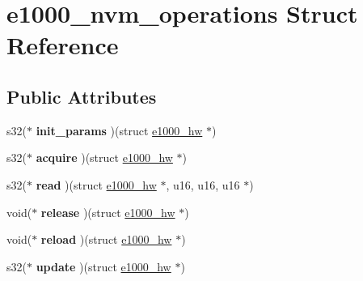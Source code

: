 \hypertarget{structe1000__nvm__operations}{
\section{e1000\_\-nvm\_\-operations Struct Reference}
\label{structe1000__nvm__operations}
}
\subsection*{Public Attributes}
\begin{DoxyCompactItemize}
\item 
\hypertarget{structe1000__nvm__operations_afb7771dd134bee981aeee957ad20549b}{
s32($\ast$ {\bfseries init\_\-params} )(struct \hyperlink{structe1000__hw}{e1000\_\-hw} $\ast$)}
\label{structe1000__nvm__operations_afb7771dd134bee981aeee957ad20549b}

\item 
\hypertarget{structe1000__nvm__operations_a521ce4663135adb16bf8e0385822c911}{
s32($\ast$ {\bfseries acquire} )(struct \hyperlink{structe1000__hw}{e1000\_\-hw} $\ast$)}
\label{structe1000__nvm__operations_a521ce4663135adb16bf8e0385822c911}

\item 
\hypertarget{structe1000__nvm__operations_a65dfa7519f2e87f7d5a583dd325e36cc}{
s32($\ast$ {\bfseries read} )(struct \hyperlink{structe1000__hw}{e1000\_\-hw} $\ast$, u16, u16, u16 $\ast$)}
\label{structe1000__nvm__operations_a65dfa7519f2e87f7d5a583dd325e36cc}

\item 
\hypertarget{structe1000__nvm__operations_a020af00d4e48abad2f72a8ea4ab6b35d}{
void($\ast$ {\bfseries release} )(struct \hyperlink{structe1000__hw}{e1000\_\-hw} $\ast$)}
\label{structe1000__nvm__operations_a020af00d4e48abad2f72a8ea4ab6b35d}

\item 
\hypertarget{structe1000__nvm__operations_a1fbf74027acf101831cf3f93b4adf597}{
void($\ast$ {\bfseries reload} )(struct \hyperlink{structe1000__hw}{e1000\_\-hw} $\ast$)}
\label{structe1000__nvm__operations_a1fbf74027acf101831cf3f93b4adf597}

\item 
\hypertarget{structe1000__nvm__operations_acbc1c40069c2d3164a40c6925299dede}{
s32($\ast$ {\bfseries update} )(struct \hyperlink{structe1000__hw}{e1000\_\-hw} $\ast$)}
\label{structe1000__nvm__operations_acbc1c40069c2d3164a40c6925299dede}


\end{DoxyCompactItemize}
